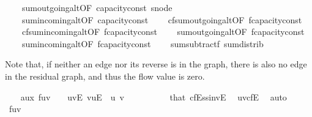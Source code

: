 \begin{isabellebody}
\ \ \ \ sum{\isacharunderscore}outgoing{\isacharunderscore}alt{\isacharbrackleft}OF\ capacity{\isacharunderscore}const{\isacharbrackright}\ s{\isacharunderscore}node\isanewline
\ \ \ \ sum{\isacharunderscore}incoming{\isacharunderscore}alt{\isacharbrackleft}OF\ capacity{\isacharunderscore}const{\isacharbrackright}\isanewline
\ \ \ \ cf{\isachardot}sum{\isacharunderscore}outgoing{\isacharunderscore}alt{\isacharbrackleft}OF\ f{\isacharprime}{\isachardot}capacity{\isacharunderscore}const{\isacharbrackright}\isanewline
\ \ \ \ cf{\isachardot}sum{\isacharunderscore}incoming{\isacharunderscore}alt{\isacharbrackleft}OF\ f{\isacharprime}{\isachardot}capacity{\isacharunderscore}const{\isacharbrackright}\isanewline
\ \ \ \ sum{\isacharunderscore}outgoing{\isacharunderscore}alt{\isacharbrackleft}OF\ f{\isacharprime}{\isacharprime}{\isachardot}capacity{\isacharunderscore}const{\isacharbrackright}\isanewline
\ \ \ \ sum{\isacharunderscore}incoming{\isacharunderscore}alt{\isacharbrackleft}OF\ f{\isacharprime}{\isacharprime}{\isachardot}capacity{\isacharunderscore}const{\isacharbrackright}\isanewline
\ \ \ \ sum{\isacharunderscore}subtractf\ sum{\isachardot}distrib%
\begin{isamarkuptxt}%
Note that, if neither an edge nor its reverse is in the graph,
    there is also no edge in the residual graph, and thus the flow value
    is zero.%
\end{isamarkuptxt}\isamarkuptrue%
\ \ \isamarkupfalse%
\ aux{}{\isacharcolon}\ {\isachardoublequoteopen}f{\isacharprime}{\isacharparenleft}u{\isacharcomma}v{\isacharparenright}\ {\isacharequal}\ {}{\isachardoublequoteclose}\ \ {\isachardoublequoteopen}{\isacharparenleft}u{\isacharcomma}v{\isacharparenright}{\isasymnotin}E{\isachardoublequoteclose}\ {\isachardoublequoteopen}{\isacharparenleft}v{\isacharcomma}u{\isacharparenright}{\isasymnotin}E{\isachardoublequoteclose}\ \ u\ v\isanewline
\ \ \isamarkupfalse%
\ {\isacharminus}\isanewline
\ \ \ \ \isamarkupfalse%
\ that\ cfE{\isacharunderscore}ss{\isacharunderscore}invE\ \isamarkupfalse%
\ {\isachardoublequoteopen}{\isacharparenleft}u{\isacharcomma}v{\isacharparenright}{\isasymnotin}cf{\isachardot}E{\isachardoublequoteclose}\ \isamarkupfalse%
\ auto\isanewline
\ \ \ \ \isamarkupfalse%
\ {\isachardoublequoteopen}f{\isacharprime}{\isacharparenleft}u{\isacharcomma}v{\isacharparenright}\ {\isacharequal}\ {}{\isachardoublequoteclose}\ \isamarkupfalse%

\end{isabellebody}
